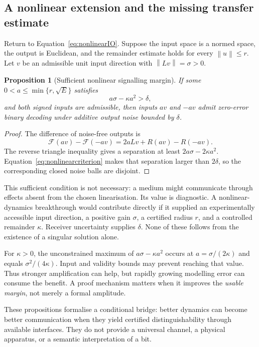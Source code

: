 \documentclass[11pt,a4paper]{article}
\newtheorem{proposition}[theorem]{Proposition}
\theoremstyle{definition}
\theoremstyle{remark}
\newcommand{\norm}[1]{\left\lVert#1\right\rVert}
\begin{document}
\subsection{A nonlinear extension and the missing transfer estimate}
Return to Equation~\eqref{eq:nonlinearIO}. Suppose the input space is a normed space, the output is Euclidean, and the remainder estimate holds for every $\norm{u}\leq r$. Let $v$ be an admissible unit input direction with $\norm{Lv}=\sigma>0$.

\begin{proposition}[Sufficient nonlinear signalling margin]\label{prop:nonlinearbit}
If some $0<a\leq\min\{r,\sqrt E\}$ satisfies
\begin{equation}\label{eq:nonlinearcriterion}
 a\sigma-\kappa a^2>\delta,
\end{equation}
and both signed inputs are admissible, then inputs $av$ and $-av$ admit zero-error binary decoding under additive output noise bounded by $\delta$.
\end{proposition}
\begin{proof}
The difference of noise-free outputs is
\[
 \mathcal F(av)-\mathcal F(-av)=2aLv+R(av)-R(-av).
\]
The reverse triangle inequality gives a separation at least $2a\sigma-2\kappa a^2$. Equation~\eqref{eq:nonlinearcriterion} makes that separation larger than $2\delta$, so the corresponding closed noise balls are disjoint.
\end{proof}
This sufficient condition is not necessary: a medium might communicate through effects absent from the chosen linearisation. Its value is diagnostic. A nonlinear-dynamics breakthrough would contribute directly if it supplied an experimentally accessible input direction, a positive gain $\sigma$, a certified radius $r$, and a controlled remainder $\kappa$. Receiver uncertainty supplies $\delta$. None of these follows from the existence of a singular solution alone.

For $\kappa>0$, the unconstrained maximum of $a\sigma-\kappa a^2$ occurs at $a=\sigma/(2\kappa)$ and equals $\sigma^2/(4\kappa)$. Input and validity bounds may prevent reaching that value. Thus stronger amplification can help, but rapidly growing modelling error can consume the benefit. A proof mechanism matters when it improves the \emph{usable margin}, not merely a formal amplitude.

These propositions formalise a conditional bridge: better dynamics can become better communication when they yield certified distinguishability through available interfaces. They do not provide a universal channel, a physical apparatus, or a semantic interpretation of a bit.
\end{document}
